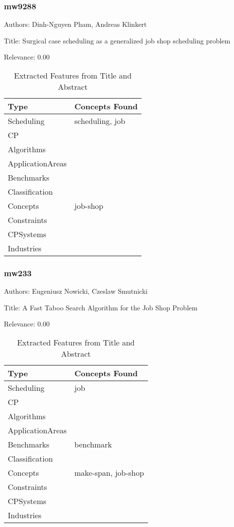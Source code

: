 \subsubsection{mw9288}
\label{mw:mw9288}

Authors: Dinh-Nguyen Pham, Andreas Klinkert

Title: Surgical case scheduling as a generalized job shop scheduling problem

Relevance:  0.00

{\scriptsize
\begin{longtable}{p{2cm}p{20cm}}
\caption{Extracted Features from Title and Abstract}\\ \toprule
Type & Concepts Found\\ \midrule
\endhead
\bottomrule
\endfoot
Scheduling & scheduling, job\\ 
CP & \\ 
Algorithms & \\ 
ApplicationAreas & \\ 
Benchmarks & \\ 
Classification & \\ 
Concepts & job-shop\\ 
Constraints & \\ 
CPSystems & \\ 
Industries & \\ 
\end{longtable}
}



\subsubsection{mw233}
\label{mw:mw233}

Authors: Eugeniusz Nowicki, Czeslaw Smutnicki

Title: A Fast Taboo Search Algorithm for the Job Shop Problem

Relevance:  0.00

{\scriptsize
\begin{longtable}{p{2cm}p{20cm}}
\caption{Extracted Features from Title and Abstract}\\ \toprule
Type & Concepts Found\\ \midrule
\endhead
\bottomrule
\endfoot
Scheduling & job\\ 
CP & \\ 
Algorithms & \\ 
ApplicationAreas & \\ 
Benchmarks & benchmark\\ 
Classification & \\ 
Concepts & make-span, job-shop\\ 
Constraints & \\ 
CPSystems & \\ 
Industries & \\ 
\end{longtable}
}

